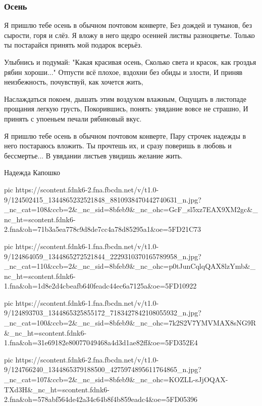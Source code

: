  
 
 

\subsubsection{Осень}

\obeycr
Я пришлю тебе осень в обычном почтовом конверте,
Без дождей и туманов, без сырости, горя и слёз.
Я вложу в него щедро осенней листвы разноцветье.
Только ты постарайся принять мой подарок всерьёз.

Улыбнись и подумай: "Какая красивая осень,
Сколько света и красок, как гроздья рябин хороши..."
Отпусти всё плохое, вздохни без обиды и злости,
И приняв неизбежность, почувствуй, как хочется жить,

Наслаждаться покоем, дышать этим воздухом влажным,
Ощущать в листопаде прощания легкую грусть,
Покорившись, понять: увядание вовсе не страшно,
И принять с упоеньем печали рябиновый вкус.

Я пришлю тебе осень в обычном почтовом конверте,
Пару строчек надежды в него постараюсь вложить.
Ты прочтешь их, и сразу поверишь в любовь и бессмертье...
В увядании листьев увидишь желание жить.

Надежда Капошко
\restorecr

\ifcmt
pic https://scontent.fdnk6-2.fna.fbcdn.net/v/t1.0-9/124502415_1344865232521848_8810938470442740631_n.jpg?_nc_cat=108&ccb=2&_nc_sid=8bfeb9&_nc_ohc=GcF_sl5xz7EAX9XM2gc&_nc_ht=scontent.fdnk6-2.fna&oh=71b3a5ea778c9d8de7cc4a78d85295a1&oe=5FD21C73

pic https://scontent.fdnk6-1.fna.fbcdn.net/v/t1.0-9/124864059_1344865272521844_2229310370165789958_n.jpg?_nc_cat=110&ccb=2&_nc_sid=8bfeb9&_nc_ohc=p0tJunCqlqQAX8lzYmb&_nc_ht=scontent.fdnk6-1.fna&oh=1d8e2d4cbeafb640feadc44ec6a7125a&oe=5FD10922

pic https://scontent.fdnk6-1.fna.fbcdn.net/v/t1.0-9/124893703_1344865325855172_7183427842108055932_n.jpg?_nc_cat=100&ccb=2&_nc_sid=8bfeb9&_nc_ohc=7k2S2V7YMVMAX8sNG9R&_nc_ht=scontent.fdnk6-1.fna&oh=31e69182e80077049468a4d3d1ae82ff&oe=5FD352E4

pic https://scontent.fdnk6-2.fna.fbcdn.net/v/t1.0-9/124766240_1344865379188500_4275974895611764865_n.jpg?_nc_cat=107&ccb=2&_nc_sid=8bfeb9&_nc_ohc=KOZLL-sJjOQAX-TXd3H&_nc_ht=scontent.fdnk6-2.fna&oh=578abf564de42a34c64b8f4b859eadc4&oe=5FD05396
\fi
